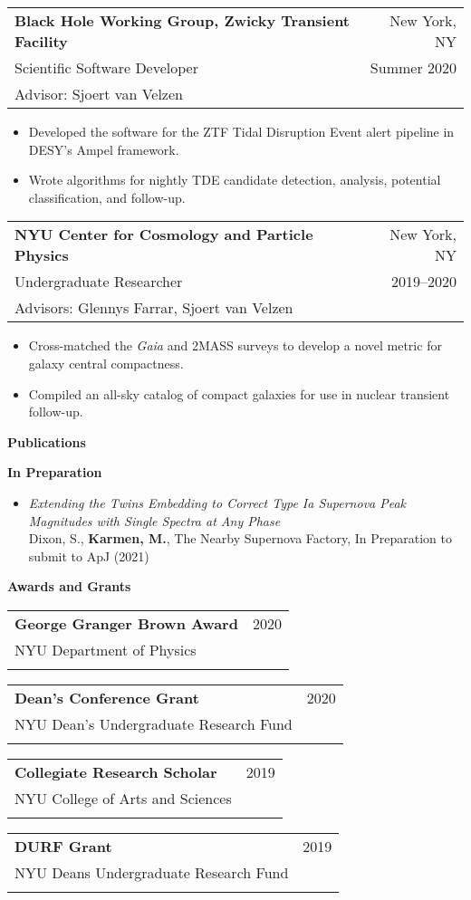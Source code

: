 \documentclass[letterpaper,10pt]{article}
\makeatletter
\newcounter{descounter}
\newcommand{\resetcounter}[0]{\setcounter{descounter}{0}}
\newcommand{\resitem}[1]{\item #1 \vspace{-6pt}}
\newcommand{\resheading}[1]{\resetcounter \vspace{15pt} {\Large \textbf{#1}} \\ \vspace{-8pt}
    \hrulefill\vspace{5pt}}
\newcommand{\ressubheading}[5]{
    \vspace{10pt}
    \begin{tabular*}{7.0in}{l@{\extracolsep{\fill}}r}
        \textbf{#1} & #2 \\
        #3 & #4 \\
        #5 & \\
    \end{tabular*}\vspace{-5pt}
}
\newcommand{\descheader}[1]{\textbf{#1}}
\makeatother
\begin{document}
    \ressubheading{Black Hole Working Group, Zwicky Transient Facility}{New York, NY}{Scientific Software Developer}{Summer 2020}{Advisor: Sjoert van Velzen}

        \begin{itemize}
                \resitem{Developed the software for the ZTF Tidal Disruption Event alert pipeline in DESY's Ampel framework.}
                \resitem{Wrote algorithms for nightly TDE candidate detection, analysis, potential classification, and follow-up.}
        \end{itemize}

    \ressubheading{NYU Center for Cosmology and Particle Physics}{New York, NY}{Undergraduate Researcher}{2019--2020}{Advisors: Glennys Farrar, Sjoert van Velzen}

        \begin{itemize}
                \resitem{Cross-matched the \textit{Gaia} and 2MASS surveys to develop a novel metric for galaxy central compactness.}
                \resitem{Compiled an all-sky catalog of compact galaxies for use in nuclear transient follow-up.}
        \end{itemize}

\resheading{Publications}

\descheader{In Preparation}

    \begin{itemize}

        \item{ \textit{Extending the Twins Embedding to Correct Type Ia Supernova Peak Magnitudes with Single Spectra at Any Phase} \\ Dixon, S., \textbf{Karmen, M.}, The Nearby Supernova Factory, In Preparation to submit to ApJ (2021) }
        \vspace{-5pt}

    \end{itemize}

\resheading{Awards and Grants}

    \ressubheading{George Granger Brown Award}{2020}{NYU Department of Physics}{}{}{}

    \vspace{-0.15in}
    \ressubheading{Dean's Conference Grant}{2020}{NYU Dean's Undergraduate Research Fund}{}{}{}

    \vspace{-0.15in}
    \ressubheading{Collegiate Research Scholar}{2019}{NYU College of Arts and Sciences}{}{}{}

    \vspace{-0.15in}
    \ressubheading{DURF Grant}{2019}{NYU Deans Undergraduate Research Fund}{}{}{}
\end{document}
